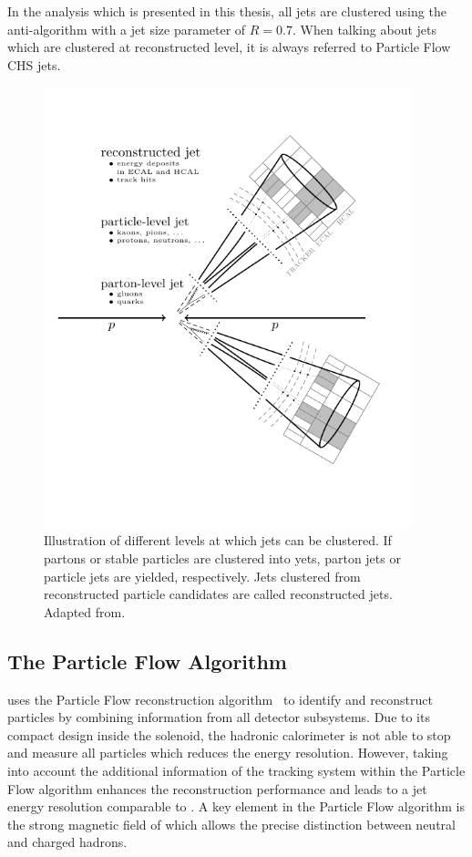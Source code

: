 In the analysis which is presented in this thesis, all jets are clustered using
the anti-\kt algorithm with a jet size parameter of $R=0.7$. When talking about
jets which are clustered at reconstructed level, it is always referred to
Particle Flow CHS jets.

\begin{figure}[h!tbp]
    \centering
    \includegraphics[width=0.95\textwidth]{figures/drawings/particlejet.pdf}
    \caption[Illustration of jet clustering levels]{Illustration of different
    levels at which jets can be clustered. If partons or stable particles are
clustered into yets, parton jets or particle jets are yielded, respectively.
Jets clustered from reconstructed particle candidates are called reconstructed
jets. Adapted from.}
    \label{fig:jet_levels}
\end{figure}


\subsection{The Particle Flow Algorithm}
\label{sec:particle_flow_algorithm}

\CMS uses the Particle Flow reconstruction
algorithm~\cite{CMS-PAS-PFT-09-001,CMS-PAS-PFT-10-001} to identify and
reconstruct particles by combining information from all detector
subsystems. Due to its compact design inside the solenoid, the hadronic
calorimeter is not able to stop and measure all particles which reduces the
energy resolution. However, taking into account the additional information of
the tracking system within the Particle Flow algorithm enhances the
reconstruction performance and leads to a jet energy resolution comparable to
\ATLAS. A key element in the Particle Flow algorithm is the strong magnetic field
of \CMS which allows the precise distinction between neutral and charged hadrons. 

